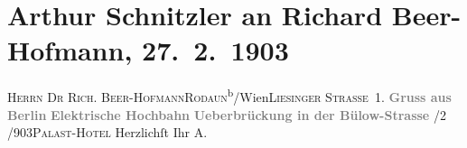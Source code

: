 

         
         \renewcommand{\erwaehntePersonen}{Personen: Richard Beer-Hofmann}
         \renewcommand{\erwaehnteOrte}{Orte: Berlin, Bülowstraße, Liesingerstraße, Palasthotel Berlin, Rodaun, Wien}
         \renewcommand{\erwaehnteWerke}{}
               \section[Arthur Schnitzler an Richard Beer-Hofmann, 27. 2. 1903]{ Arthur Schnitzler an Richard Beer-Hofmann, 27. 2. 1903}\nopagebreak{}\rehead{ }\begin{ledgroupsized}[t]{13cm}\normalsize\beginnumbering{} \toendnotes[C]{\smallbreak\pagebreak[2]} 
\pstart{}{\pb}\textsc{Herrn Dr Rich. Beer-Hofmann}\pend{}\pstart{}\textsc{Rodaun}\textsuperscript{b}/Wien\pend{}\pstart{}\textsc{Liesinger Straße 1.}\pend{}{\bigskip}\pstart
           \noindent{}\centering{}{\pb}\textcolor{gray}{\textbf{Gruss aus Berlin}}\pend
           \pstart
           \noindent{}\centering{}\textcolor{gray}{\textbf{Elektrische Hochbahn}}\pend
           \pstart
           \noindent{}\centering{}\textcolor{gray}{\textbf{Ueberbrückung in der Bülow-Strasse}}\pend
           /2 /903\hspace*{1.5em}\textsc{Palast-Hotel}\pend
           \pstart Herzlichſt Ihr \spacefill\mbox{A.}\pend{}
         
         \endnumbering{}\end{ledgroupsized}  \newcommand{\dateiname}{L01273}\newcommand{\titel}{Arthur Schnitzler an Richard Beer-Hofmann, 27. 2. 1903}\newcommand{\editorInnen}{Martin Anton Müller und Gerd-Hermann Susen}
      